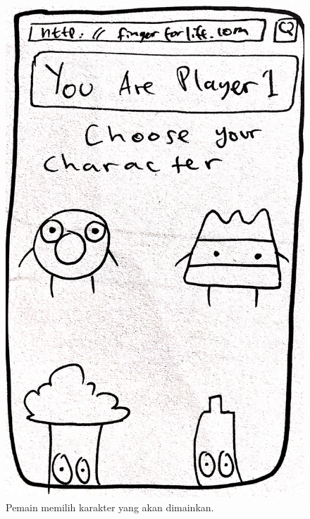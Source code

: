 \documentclass[a4paper,twoside]{article}
\begin{document}
\begin{enumerate}
		\begin{figure}[H]
			\centering
			\includegraphics[scale=0.1]{Gambar/mob3_char1}
			\caption{Pemain memilih karakter yang akan dimainkan.}
			\label{fig:12_mob3_char1}
		\end{figure}
	

\end{enumerate}
\end{document}
